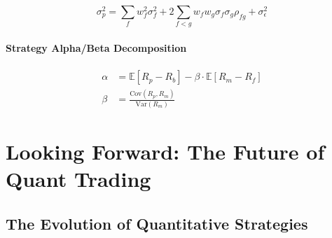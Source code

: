 \documentclass[11pt,letterpaper]{book}
\newcommand{\E}{\mathbb{E}}
\newcommand{\Var}{\mathrm{Var}}
\newcommand{\Cov}{\mathrm{Cov}}
\begin{document}
\begin{equation}
\sigma_p^2 = \sum_f w_f^2 \sigma_f^2 + 2 \sum_{f<g} w_f w_g \sigma_f \sigma_g \rho_{fg} + \sigma_{\epsilon}^2
\end{equation}

\subsubsection{Strategy Alpha/Beta Decomposition}

\begin{align}
\alpha &= \E[R_p - R_b] - \beta \cdot \E[R_m - R_f] \\
\beta &= \frac{\Cov(R_p, R_m)}{\Var(R_m)}
\end{align}

\chapter{Looking Forward: The Future of Quant Trading}

\section{The Evolution of Quantitative Strategies}
\end{document}
